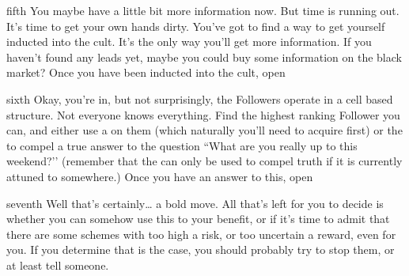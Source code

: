 \documentclass[notebook]{GL2020} %
\begin{document}
\begin{page}{fifth}
You maybe have a little bit more information now. But time is running out. It’s time to get your own hands dirty. You've got to find a way to get yourself inducted into the cult. It’s the only way you’ll get more information. If you haven’t found any leads yet, maybe you could buy some information on the black market? Once you have been inducted into the cult, open 
\end{page}

\begin{page}{sixth}
Okay, you’re in, but not surprisingly, the Followers operate in a cell based structure. Not everyone knows everything. Find the highest ranking Follower you can, and either use a \iHonesty{} on them (which naturally you’ll need to acquire first) or the \iLariat{} to compel a true answer to the question ``What are you really up to this weekend?’’ (remember that the \iLariat{} can only be used to compel truth if it is currently attuned to somewhere.) Once you have an answer to this, open 
\end{page}

\begin{page}{seventh}
Well that’s certainly\ldots{} a bold move. All that’s left for you to decide is whether you can somehow use this to your benefit, or if it’s time to admit that there are some schemes with too high a risk, or too uncertain a reward, even for you. If you determine that is the case, you should probably try to stop them, or at least tell someone.
\end{page}

\endnotebook
\end{document}
